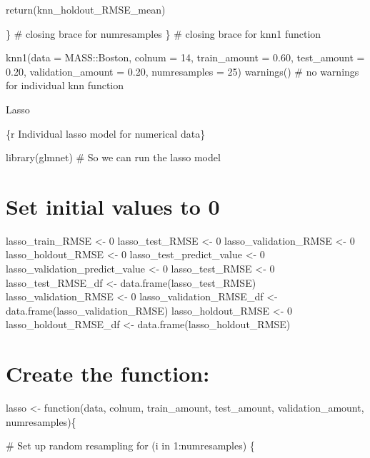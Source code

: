 \documentclass[
]{book}
\begin{document}
return(knn\_holdout\_RMSE\_mean)

\} \# closing brace for numresamples \} \# closing brace for knn1 function

knn1(data = MASS::Boston, colnum = 14, train\_amount = 0.60, test\_amount
= 0.20, validation\_amount = 0.20, numresamples = 25) warnings() \# no
warnings for individual knn function

Lasso

\{r Individual lasso model for numerical data\}

library(glmnet) \# So we can run the lasso model

\chapter{Set initial values to 0}\label{set-initial-values-to-0-8}

lasso\_train\_RMSE \textless- 0 lasso\_test\_RMSE \textless- 0 lasso\_validation\_RMSE \textless- 0
lasso\_holdout\_RMSE \textless- 0 lasso\_test\_predict\_value \textless- 0
lasso\_validation\_predict\_value \textless- 0 lasso\_test\_RMSE \textless- 0
lasso\_test\_RMSE\_df \textless- data.frame(lasso\_test\_RMSE) lasso\_validation\_RMSE
\textless- 0 lasso\_validation\_RMSE\_df \textless- data.frame(lasso\_validation\_RMSE)
lasso\_holdout\_RMSE \textless- 0 lasso\_holdout\_RMSE\_df \textless-
data.frame(lasso\_holdout\_RMSE)

\chapter{Create the function:}\label{create-the-function-5}

lasso \textless- function(data, colnum, train\_amount, test\_amount,
validation\_amount, numresamples)\{

\# Set up random resampling for (i in 1:numresamples) \{
\end{document}
